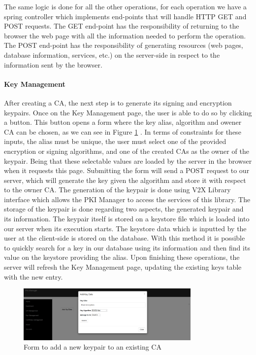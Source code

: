 The same logic is done for all the other operations, for each operation we have a spring controller which implements end-points that will handle HTTP GET and POST requests. The GET end-point has the responsibility of returning to the browser the web page with all the information needed to perform the operation. The POST end-point has the responsibility of generating resources (web pages, database information, services, etc.) on the server-side in respect to the information sent by the browser.

\paragraph{Key Management}
After creating a CA, the next step is to generate its signing and encryption keypairs. Once on the Key Management page, the user is able to do so by clicking a button. This button opens a form where the key alias, algorithm and owener CA can be chosen, as we can see in Figure \ref{fig:manager3} . In terms of constraints for these inputs, the alias must be unique, the user must select one of the provided encryption or signing algorithms, and one of the created CAs as the owner of the keypair. Being that these selectable values are loaded by the server in the browser when it requests this page. Submitting the form will send a POST request to our server, which will generate the key given the algorithm and store it with respect to the owner CA. The generation of the keypair is done using V2X Library interface which allows the PKI Manager to access the services of this library. The storage of the keypair is done regarding two aspects, the generated keypair and its information. The keypair itself is stored on a keystore file which is loaded into our server when its execution starts. The keystore data which is inputted by the user at the client-side is stored on the database. With this method it is possible to quickly search for a key in our database using its information and then find its value on the keystore providing the alias. Upon finishing these operations, the server will refresh the Key Management page, updating the existing keys table with the new entry.

\begin{figure}[!h]
	\centering
	\includegraphics[width=0.8\textwidth]{Figures/manager3}
	\caption{\label{fig:manager3}Form to add a new keypair to an existing CA}
\end{figure}

